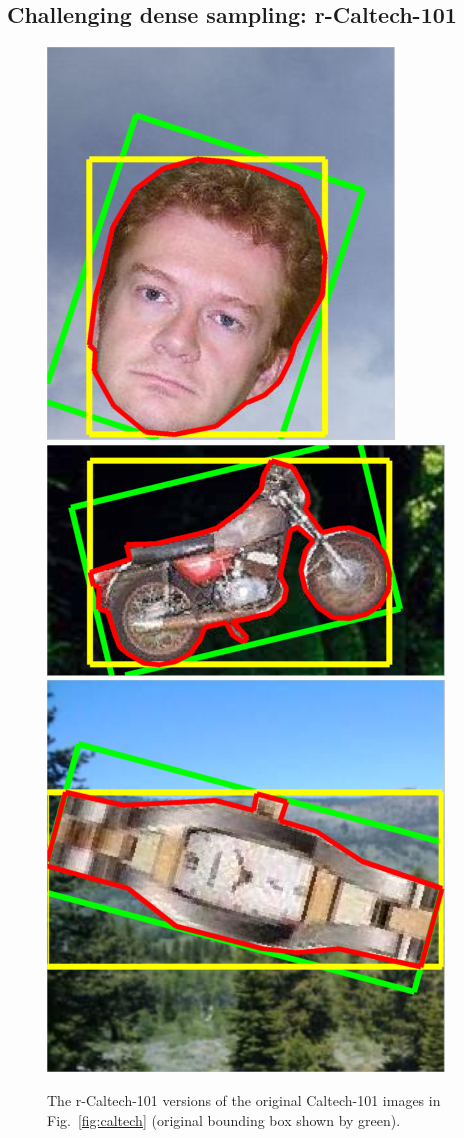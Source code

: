 \documentclass[10pt,journal,cspaper,compsoc]{IEEEtran}
\begin{document}
\subsection{Challenging dense sampling: r-Caltech-101\label{sec:challenging}}
%
\begin{figure}[h]
\begin{center}
  \includegraphics[width=0.25\linewidth]{resources/r-caltech-101_face_example.png}
  \includegraphics[width=0.4\linewidth]{resources/r-caltech-101_motorbikes_example.png}
  \includegraphics[width=0.25\linewidth]{resources/r-caltech-101_watch_example.png}
  \caption{The r-Caltech-101 versions of the original Caltech-101 images in Fig.~\ref{fig:caltech}
    (original bounding box shown by green).\label{fig:rcaltech}}
  \end{center}
\end{figure}
%
%
\end{document}
